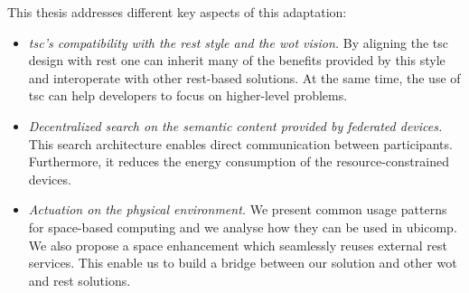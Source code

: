 This thesis addresses different key aspects of this adaptation:
\begin{itemize}
  \item \emph{\ac{tsc}'s compatibility with the \acs{rest} style and the \ac{wot} vision.}
	By aligning the \ac{tsc} design with \ac{rest} one can inherit many of the benefits provided by this style and interoperate with other \ac{rest}-based solutions.
	At the same time, the use of \ac{tsc} can help developers to focus on higher-level problems.
	
  \item \emph{Decentralized search on the semantic content provided by federated devices.}
	This search architecture enables direct communication between participants.
	Furthermore, it reduces the energy consumption of the resource-constrained devices.
	
  \item \emph{Actuation on the physical environment.}
	We present common usage patterns for space-based computing and we analyse how they can be used in \ac{ubicomp}.
	We also propose a space enhancement which seamlessly reuses external \ac{rest} services.
	This enable us to build a bridge between our solution and other \ac{wot} and \ac{rest} solutions.
\end{itemize}
